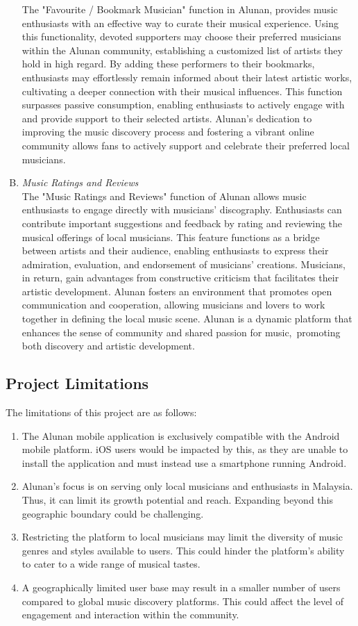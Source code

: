 \begin{enumerate}[A.]
    The "Favourite / Bookmark Musician" function in Alunan, provides music enthusiasts with an effective way to curate their musical experience. Using this functionality, devoted supporters may choose their preferred musicians within the Alunan community, establishing a customized list of artists they hold in high regard. By adding these performers to their bookmarks, enthusiasts may effortlessly remain informed about their latest artistic works, cultivating a deeper connection with their musical influences. This function surpasses passive consumption, enabling enthusiasts to actively engage with and provide support to their selected artists. Alunan's dedication to improving the music discovery process and fostering a vibrant online community allows fans to actively support and celebrate their preferred local musicians.
    \item \textit{Music Ratings and Reviews}\\
    The "Music Ratings and Reviews" function of Alunan allows music enthusiasts to engage directly with musicians' discography. Enthusiasts can contribute important suggestions and feedback by rating and reviewing the musical offerings of local musicians. This feature functions as a bridge between artists and their audience, enabling enthusiasts to express their admiration, evaluation, and endorsement of musicians' creations. Musicians, in return, gain advantages from constructive criticism that facilitates their artistic development. Alunan fosters an environment that promotes open communication and cooperation, allowing musicians and lovers to work together in defining the local music scene. Alunan is a dynamic platform that enhances the sense of community and shared passion for music, promoting both discovery and artistic development.
\end{enumerate}

\subsection{Project Limitations}
The limitations of this project are as follows:
\begin{enumerate}[1.]
    \item The Alunan mobile application is exclusively compatible with the Android mobile platform. iOS users would be impacted by this, as they are unable to install the application and must instead use a smartphone running Android. 
    \item Alunan's focus is on serving only local musicians and enthusiasts in Malaysia. Thus, it can limit its growth potential and reach. Expanding beyond this geographic boundary could be challenging.
    \item Restricting the platform to local musicians may limit the diversity of music genres and styles available to users. This could hinder the platform's ability to cater to a wide range of musical tastes.
    \item A geographically limited user base may result in a smaller number of users compared to global music discovery platforms. This could affect the level of engagement and interaction within the community.
\end{enumerate}
\pagebreak

